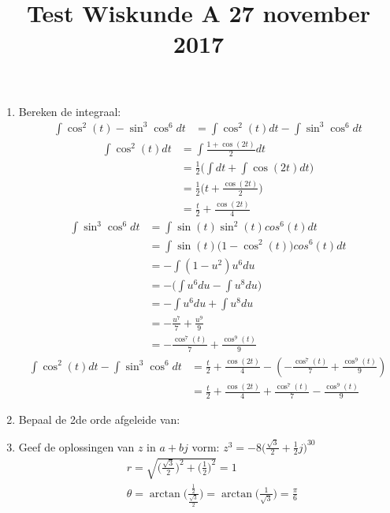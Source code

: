 \documentclass{article}
\title{Test Wiskunde A 27 november 2017}
\author{}
\date{}
\begin{document}
\maketitle
\begin{enumerate}
 \item Bereken de integraal: 
      \begin{align*}
       \int \cos^{2}(t) - \sin^{3}\cos^{6}dt &= \int \cos^{2}(t)dt - \int \sin^{3}\cos^{6}dt
      \end{align*}
      \begin{align*}
       \int \cos^{2}(t)dt &= \int \frac{1 + \cos(2t)}{2} dt \\
       &= \frac{1}{2} \biggl(\int dt + \int \cos(2t) dt\biggl) \\
       &= \frac{1}{2} \biggl(t + \frac{\cos(2t)}{2} \biggl) \\
       &= \frac{t}{2} + \frac{\cos(2t)}{4}
      \end{align*}
      \begin{align*}
       \int \sin^{3}\cos^{6}dt &= \int \sin(t)\sin^{2}(t)cos^{6}(t)dt \\
       &= \int \sin(t)\biggl(1 - \cos^{2}(t)\biggl)cos^{6}(t)dt \\
       &= -\int (1 - u^{2}) u^{6} du \\
       &= -\biggl(\int u^{6} du - \int u^{8} du \biggl)\\
       &= -\int u^{6} du + \int u^{8} du \\
       &= -\frac{u^{7}}{7} + \frac{u^{9}}{9} \\
       &= -\frac{\cos^{7}(t)}{7} + \frac{\cos^{9}(t)}{9} 
      \end{align*}
      \begin{align*}
	\int \cos^{2}(t)dt - \int \sin^{3}\cos^{6}dt &= \frac{t}{2} + \frac{\cos(2t)}{4} - (-\frac{\cos^{7}(t)}{7} + \frac{\cos^{9}(t)}{9} )
      \\&= \frac{t}{2} + \frac{\cos(2t)}{4} + \frac{\cos^{7}(t)}{7} - \frac{\cos^{9}(t)}{9}
     \end{align*}
 \newpage
 \item Bepaal de 2de orde afgeleide van: 
 \newpage
 \item Geef de oplossingen van $z$ in $ a + bj $ vorm: $z^{3} = -8\biggl(\frac{\sqrt{3}}{2} + \frac{1}{2}j\biggl)^{30}$
 \begin{align*}
    &r = \sqrt{\biggl(\frac{\sqrt{3}}{2}\biggl)^{2} + \biggl(\frac{1}{2}\biggl)^{2}} = 1 \\
    &\theta = \arctan{\biggl(\frac{\frac{1}{2}}{\frac{\sqrt{3}}{2}}\biggl)} = \arctan{\biggl(\frac{1}{\sqrt{3}}}\biggl) = \frac{\pi}{6} \\

\end{align*}
\end{enumerate}
\end{document}
